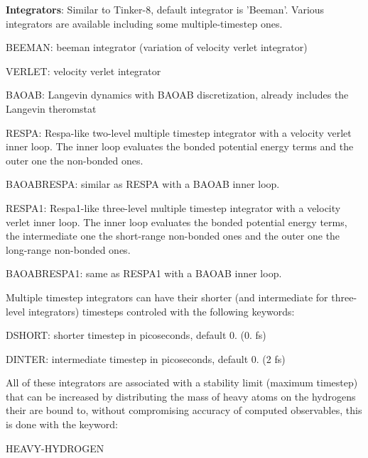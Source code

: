 {\bfseries Integrators}\-: Similar to Tinker-\/8, default integrator is 'Beeman'. Various integrators are available including some multiple-\/timestep ones.
\begin{DoxyItemize}
\item B\-E\-E\-M\-A\-N\-: beeman integrator (variation of velocity verlet integrator)
\item V\-E\-R\-L\-E\-T\-: velocity verlet integrator
\item B\-A\-O\-A\-B\-: Langevin dynamics with B\-A\-O\-A\-B discretization, already includes the Langevin theromstat
\item R\-E\-S\-P\-A\-: Respa-\/like two-\/level multiple timestep integrator with a velocity verlet inner loop. The inner loop evaluates the bonded potential energy terms and the outer one the non-\/bonded ones.
\item B\-A\-O\-A\-B\-R\-E\-S\-P\-A\-: similar as R\-E\-S\-P\-A with a B\-A\-O\-A\-B inner loop.
\item R\-E\-S\-P\-A1\-: Respa1-\/like three-\/level multiple timestep integrator with a velocity verlet inner loop. The inner loop evaluates the bonded potential energy terms, the intermediate one the short-\/range non-\/bonded ones and the outer one the long-\/range non-\/bonded ones.
\item B\-A\-O\-A\-B\-R\-E\-S\-P\-A1\-: same as R\-E\-S\-P\-A1 with a B\-A\-O\-A\-B inner loop.
\end{DoxyItemize}

Multiple timestep integrators can have their shorter (and intermediate for three-\/level integrators) timesteps controled with the following keywords\-:
\begin{DoxyItemize}
\item D\-S\-H\-O\-R\-T\-: shorter timestep in picoseconds, default 0. (0. fs)
\item D\-I\-N\-T\-E\-R\-: intermediate timestep in picoseconds, default 0. (2 fs)
\end{DoxyItemize}

All of these integrators are associated with a stability limit (maximum timestep) that can be increased by distributing the mass of heavy atoms on the hydrogens their are bound to, without compromising accuracy of computed observables, this is done with the keyword\-:
\begin{DoxyItemize}
\item H\-E\-A\-V\-Y-\/\-H\-Y\-D\-R\-O\-G\-E\-N
\end{DoxyItemize}

